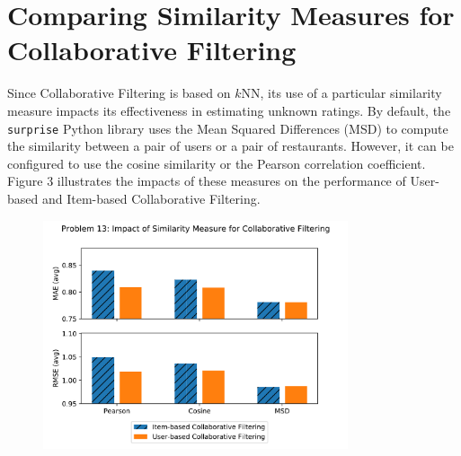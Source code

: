 \documentclass[11pt]{article}
\begin{document}


\section{Comparing Similarity Measures for Collaborative Filtering}

Since Collaborative Filtering is based on $k$NN, its use of a particular similarity measure impacts its effectiveness in estimating unknown ratings.
By default, the \texttt{surprise} Python library uses the Mean Squared Differences (MSD) to compute the similarity between a pair of users or a pair of restaurants.
However, it can be configured to use the cosine similarity or the Pearson correlation coefficient.
Figure 3 illustrates the impacts of these measures on the performance of User-based and Item-based Collaborative Filtering.

\begin{figure}[h!] \label{fig:something}
  \centering
  \includegraphics[width=0.8\textwidth]{sim_comp}
  \caption{}
\end{figure}
\end{document}
